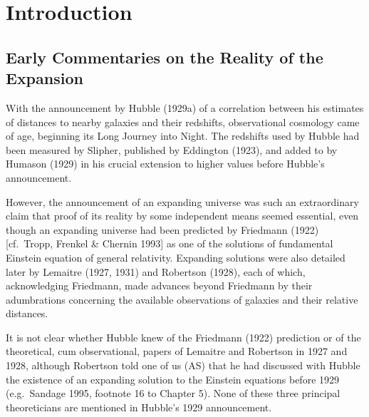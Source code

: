 \documentclass[preprint]{aastex}
\begin{document}


\section{Introduction}

\subsection{Early Commentaries on the Reality of the Expansion}

With the announcement by Hubble (1929a) of a correlation between his
estimates of distances to nearby galaxies and their redshifts,
observational cosmology came of age, beginning its Long Journey into
Night. The redshifts used by Hubble had been measured by Slipher,
published by Eddington (1923), and added to by Humason (1929) in his
crucial extension to higher values before Hubble's announcement.

However, the announcement of an expanding universe was such an
extraordinary claim that proof of its reality by some independent
means seemed essential, even though an expanding universe had been
predicted by Friedmann (1922) [cf.\ Tropp, Frenkel \& Chernin 1993] as
one of the solutions of fundamental Einstein equation of general
relativity.  Expanding solutions were also detailed later by Lemaitre
(1927, 1931) and Robertson (1928), each of which, acknowledging
Friedmann, made advances beyond Friedmann by their adumbrations
concerning the available observations of galaxies and their relative
distances.

It is not clear whether Hubble knew of the Friedmann (1922) prediction
or of the theoretical, cum observational, papers of Lemaitre and
Robertson in 1927 and 1928, although Robertson told one of us (AS)
that he had discussed with Hubble the existence of an expanding
solution to the Einstein equations before 1929 (e.g.\ Sandage 1995,
footnote 16 to Chapter 5). None of these three principal theoreticians
are mentioned in Hubble's 1929 announcement.
\end{document}
